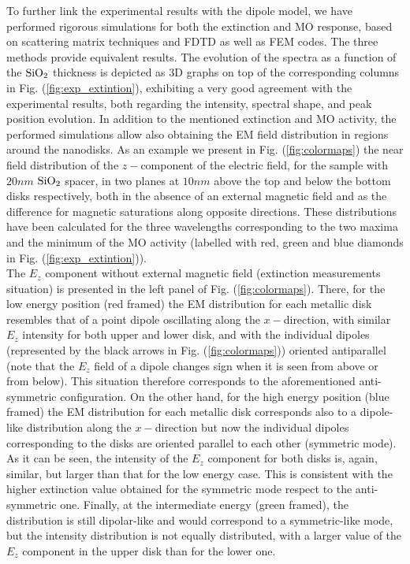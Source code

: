To further link the experimental results with the dipole model, we have performed rigorous simulations for both the extinction and MO response, based on scattering matrix techniques \cite{garcia2005light, caballero2012generalized} and FDTD \cite{lumericalcite} as well as FEM \cite{comsolcite} codes. The three methods provide equivalent results. The evolution of the spectra as a function of the $\textnormal{SiO}_{2}$ thickness is depicted as 3D graphs on top of the corresponding columns in Fig. (\ref{fig:exp_extintion}), exhibiting a very good agreement with the experimental results, both regarding the intensity, spectral shape, and peak position evolution. In addition to the mentioned extinction and MO activity, the performed simulations allow also obtaining the EM field distribution in regions around the nanodisks. As an example we present in Fig. (\ref{fig:colormaps}) the near field distribution of the $z-$component of the electric field, for the sample with $20nm$ $\textnormal{SiO}_{2}$ spacer, in two planes at $10 nm$ above the top and below the bottom disks respectively, both in the absence of an external magnetic field and as the difference for magnetic saturations along opposite directions. These distributions have been calculated for the three wavelengths corresponding to the two maxima and the minimum of the MO activity (labelled with red, green and blue diamonds in Fig. (\ref{fig:exp_extintion})).\\
The $E_{z}$ component without external magnetic field (extinction measurements situation) is presented in the left panel of Fig. (\ref{fig:colormaps}). There, for the low energy position (red framed) the EM distribution for each metallic disk resembles that of a point dipole oscillating along the $x-$direction, with similar $E_{z}$ intensity for both upper and lower disk, and with the individual dipoles (represented by the black arrows in Fig. (\ref{fig:colormaps})) oriented antiparallel (note that the $E_{z}$ field of a dipole changes sign when it is seen from above or from below). This situation therefore corresponds to the aforementioned anti-symmetric configuration. On the other hand, for the high energy position (blue framed) the EM distribution for each metallic disk corresponds also to a dipole-like distribution along the $x-$direction but now the individual dipoles corresponding to the disks are oriented parallel to each other (symmetric mode). As it can be seen, the intensity of the $E_z$ component for both disks is, again, similar, but larger than that for the low energy case. This is consistent with the higher extinction value obtained for the symmetric mode respect to the anti-symmetric one. Finally, at the intermediate energy (green framed), the distribution is still dipolar-like and would correspond to a symmetric-like mode, but the intensity distribution is not equally distributed, with a larger value of the $E_z$ component in the upper disk than for the lower one.

